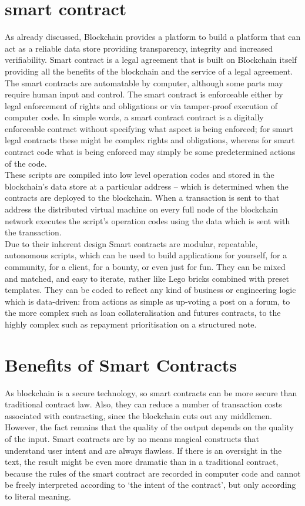 \section{smart contract}
As already discussed, Blockchain provides a platform to build a platform that can act as a reliable data store providing transparency, integrity and increased verifiability. Smart contract is a legal agreement that is built on Blockchain itself providing all the benefits of the blockchain and the service of a legal agreement. The smart contracts are automatable by computer, although some parts may require human input and control. The smart contract is enforceable either by legal enforcement of rights and obligations or via tamper-proof execution of computer code.\cite{Clack2016SmartDirections}
In simple words, a smart contract contract is a digitally enforceable contract without specifying what aspect is being enforced; for smart legal contracts these might be complex rights and obligations, whereas for smart contract code what is being enforced may simply be some predetermined actions of the code.
\\These scripts are compiled into low level operation codes and stored in the blockchain’s data store at a particular address – which is determined when the contracts are deployed to the blockchain. When a transaction is sent to that address the distributed virtual machine on every full node of the blockchain network executes the script’s operation codes using the data which is sent with the transaction. \cite{MonaxContracts}
\\Due to their inherent design Smart contracts are modular, repeatable, autonomous scripts, which can be used to build applications for yourself, for a community, for a client, for a bounty, or even just for fun. They can be mixed and matched, and easy to iterate, rather like Lego bricks combined with preset templates.
They can be coded to reflect any kind of business or engineering logic which is data-driven: from actions as simple as up-voting a post on a forum, to the more complex such as loan collateralisation and futures contracts, to the highly complex such as repayment prioritisation on a structured note.

\section{Benefits of Smart Contracts}
As blockchain is a secure technology, so smart contracts can be more secure than traditional contract law. Also, they can reduce a number of transaction costs associated with contracting, since the blockchain cuts out any middlemen. However, the fact remains that the quality of the output depends on the quality of the input. Smart contracts are by no means magical constructs that understand user intent and are always flawless. If there is an oversight in the text, the result might be even more dramatic than in a traditional contract, because the rules of the smart contract are recorded in computer code and cannot be freely interpreted according to ‘the intent of the contract’, but only according to literal meaning.

